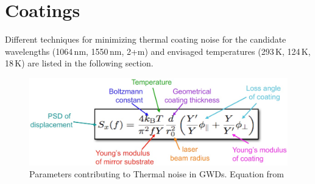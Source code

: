 
\chapter{Coatings}
\label{sec:Appendix_Coatings}

Different techniques for minimizing thermal coating noise for the candidate wavelengths (1064\,nm, 1550\,nm, 2+\textmu m) and envisaged temperatures (293\,K, 124\,K, 18\,K) are listed in the following section. \\

\begin{figure}[ht]
\centering
\includegraphics*[width=\textwidth]{Figures/Thermal_noise.jpg}
\caption{Parameters contributing to Thermal noise in GWDs. Equation from \cite{Harry:CQG2002}}
\label{fig:Thermal_Noise}
\end{figure}

